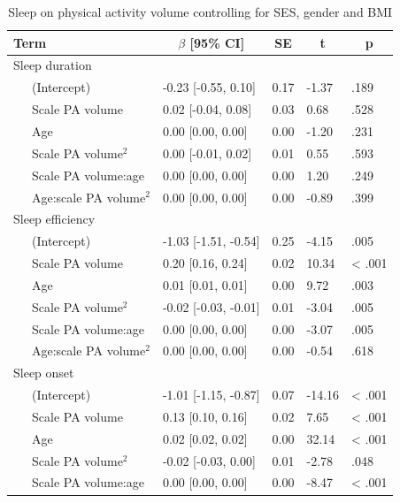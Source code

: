 \documentclass[
  man]{apa6}
\begin{document}
\begin{table}[tbp]

\begin{center}
\begin{threeparttable}

\caption{\label{tab:sleep-by-volume}Sleep on physical activity volume controlling for SES, gender and BMI}

\begin{tabular}{lllll}
\toprule
Term & \multicolumn{1}{c}{$\beta$ [95\% CI]} & \multicolumn{1}{c}{SE} & \multicolumn{1}{c}{t} & \multicolumn{1}{c}{p}\\
\midrule
Sleep duration &  &  &  & \\
\ \ \ (Intercept) & -0.23 [-0.55, 0.10] & 0.17 & -1.37 & .189\\
\ \ \ Scale PA volume & 0.02 [-0.04, 0.08] & 0.03 & 0.68 & .528\\
\ \ \ Age & 0.00 [0.00, 0.00] & 0.00 & -1.20 & .231\\
\ \ \ Scale PA volume$^2$ & 0.00 [-0.01, 0.02] & 0.01 & 0.55 & .593\\
\ \ \ Scale PA volume:age & 0.00 [0.00, 0.00] & 0.00 & 1.20 & .249\\
\ \ \ Age:scale PA volume$^2$ & 0.00 [0.00, 0.00] & 0.00 & -0.89 & .399\\
Sleep efficiency &  &  &  & \\
\ \ \ (Intercept) & -1.03 [-1.51, -0.54] & 0.25 & -4.15 & .005\\
\ \ \ Scale PA volume & 0.20 [0.16, 0.24] & 0.02 & 10.34 & < .001\\
\ \ \ Age & 0.01 [0.01, 0.01] & 0.00 & 9.72 & .003\\
\ \ \ Scale PA volume$^2$ & -0.02 [-0.03, -0.01] & 0.01 & -3.04 & .005\\
\ \ \ Scale PA volume:age & 0.00 [0.00, 0.00] & 0.00 & -3.07 & .005\\
\ \ \ Age:scale PA volume$^2$ & 0.00 [0.00, 0.00] & 0.00 & -0.54 & .618\\
Sleep onset &  &  &  & \\
\ \ \ (Intercept) & -1.01 [-1.15, -0.87] & 0.07 & -14.16 & < .001\\
\ \ \ Scale PA volume & 0.13 [0.10, 0.16] & 0.02 & 7.65 & < .001\\
\ \ \ Age & 0.02 [0.02, 0.02] & 0.00 & 32.14 & < .001\\
\ \ \ Scale PA volume$^2$ & -0.02 [-0.03, 0.00] & 0.01 & -2.78 & .048\\
\ \ \ Scale PA volume:age & 0.00 [0.00, 0.00] & 0.00 & -8.47 & < .001\\

\end{tabular}
\end{threeparttable}
\end{center}
\end{table}
\end{document}
